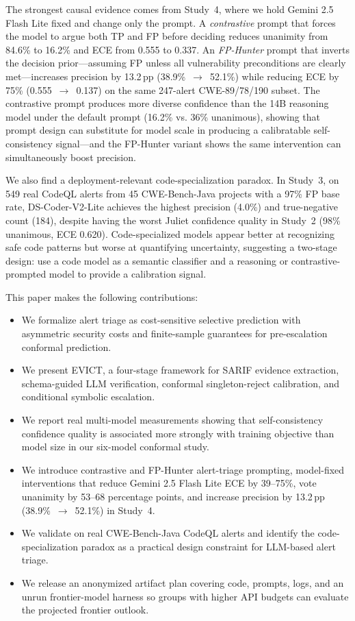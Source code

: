 The strongest causal evidence comes from Study~4, where we hold Gemini 2.5 Flash Lite fixed and change only the prompt. A \emph{contrastive} prompt that forces the model to argue both TP and FP before deciding reduces unanimity from 84.6\% to 16.2\% and ECE from 0.555 to 0.337. An \emph{FP-Hunter} prompt that inverts the decision prior---assuming FP unless all vulnerability preconditions are clearly met---increases precision by 13.2\,pp (38.9\%~$\to$~52.1\%) while reducing ECE by 75\% (0.555~$\to$~0.137) on the same 247-alert CWE-89/78/190 subset. The contrastive prompt produces more diverse confidence than the 14B reasoning model under the default prompt (16.2\% vs. 36\% unanimous), showing that prompt design can substitute for model scale in producing a calibratable self-consistency signal---and the FP-Hunter variant shows the same intervention can simultaneously boost precision.

We also find a deployment-relevant code-specialization paradox. In Study~3, on 549 real CodeQL alerts from 45 CWE-Bench-Java projects with a 97\% FP base rate, DS-Coder-V2-Lite achieves the highest precision (4.0\%) and true-negative count (184), despite having the worst Juliet confidence quality in Study~2 (98\% unanimous, ECE 0.620). Code-specialized models appear better at recognizing safe code patterns but worse at quantifying uncertainty, suggesting a two-stage design: use a code model as a semantic classifier and a reasoning or contrastive-prompted model to provide a calibration signal.

This paper makes the following contributions:
\begin{itemize}
\item We formalize alert triage as cost-sensitive selective prediction with asymmetric security costs and finite-sample guarantees for pre-escalation conformal prediction.
\item We present EVICT, a four-stage framework for SARIF evidence extraction, schema-guided LLM verification, conformal singleton-reject calibration, and conditional symbolic escalation.
\item We report real multi-model measurements showing that self-consistency confidence quality is associated more strongly with training objective than model size in our six-model conformal study.
\item We introduce contrastive and FP-Hunter alert-triage prompting, model-fixed interventions that reduce Gemini 2.5 Flash Lite ECE by 39--75\%, vote unanimity by 53--68 percentage points, and increase precision by 13.2\,pp (38.9\%~$\to$~52.1\%) in Study~4.
\item We validate on real CWE-Bench-Java CodeQL alerts and identify the code-specialization paradox as a practical design constraint for LLM-based alert triage.
\item We release an anonymized artifact plan covering code, prompts, logs, and an unrun frontier-model harness so groups with higher API budgets can evaluate the projected frontier outlook.
\end{itemize}
